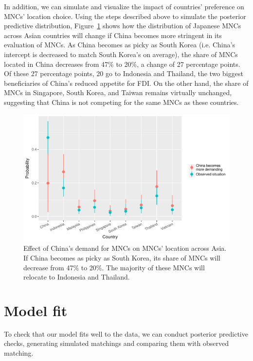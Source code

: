 In addition, we can simulate and visualize the impact of countries' preference
on MNCs' location choice. Using the steps described above to simulate the
posterior predictive distribution,
Figure~\ref{fig:japan96_sim_china_more_demanding} shows how the distribution of
Japanese MNCs across Asian countries will change if China becomes more stringent
in its evaluation of MNCs. As China becomes as picky as South Korea (i.e.
China's intercept is decreased to match South Korea's on average), the share of MNCs
located in China decreases from 47\% to 20\%, a change of 27 percentage
points. Of these 27 percentage points, 20 go to Indonesia and Thailand, the two
biggest beneficiaries of China's reduced appetite for FDI. On the other hand, the
share of MNCs in Singapore, South Korea, and Taiwan remains virtually unchanged,
suggesting that China is not competing for the same MNCs as these countries.

\begin{figure}[!ht]
  \centering
  \includegraphics[width=\textwidth,keepaspectratio]{../figure/japan96_sim_china_more_demanding}
  \caption[Effect of China's demand for MNCs on MNCs' location across
  Asia.]{Effect of China's demand for MNCs on MNCs' location across Asia. If
    China becomes as picky as South Korea, its share of MNCs will decrease from
    47\% to 20\%. The majority of these MNCs will relocate to Indonesia and
    Thailand.}
  \label{fig:japan96_sim_china_more_demanding}
\end{figure}

\section{Model fit}
\label{sec:model_fit}

To check that our model fits well to the data, we can conduct posterior
predictive checks, generating simulated matchings and comparing them with observed
matching.

